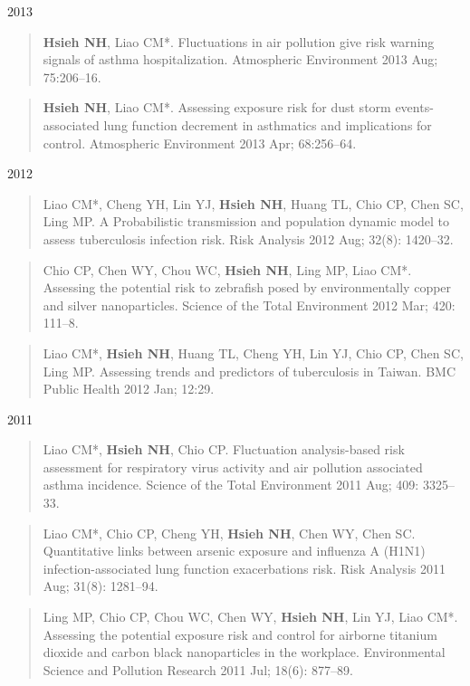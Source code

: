 \documentclass[10pt,]{article}
\begin{document}
2013

\begin{quote}
\textbf{Hsieh NH}, Liao CM*. Fluctuations in air pollution give risk
warning signals of asthma hospitalization. Atmospheric Environment 2013
Aug; 75:206--16.
\end{quote}

\begin{quote}
\textbf{Hsieh NH}, Liao CM*. Assessing exposure risk for dust storm
events-associated lung function decrement in asthmatics and implications
for control. Atmospheric Environment 2013 Apr; 68:256--64.
\end{quote}

2012

\begin{quote}
Liao CM*, Cheng YH, Lin YJ, \textbf{Hsieh NH}, Huang TL, Chio CP, Chen
SC, Ling MP. A Probabilistic transmission and population dynamic model
to assess tuberculosis infection risk. Risk Analysis 2012 Aug; 32(8):
1420--32.
\end{quote}

\begin{quote}
Chio CP, Chen WY, Chou WC, \textbf{Hsieh NH}, Ling MP, Liao CM*.
Assessing the potential risk to zebrafish posed by environmentally
copper and silver nanoparticles. Science of the Total Environment 2012
Mar; 420: 111--8.
\end{quote}

\begin{quote}
Liao CM*, \textbf{Hsieh NH}, Huang TL, Cheng YH, Lin YJ, Chio CP, Chen
SC, Ling MP. Assessing trends and predictors of tuberculosis in Taiwan.
BMC Public Health 2012 Jan; 12:29.
\end{quote}

2011

\begin{quote}
Liao CM*, \textbf{Hsieh NH}, Chio CP. Fluctuation analysis-based risk
assessment for respiratory virus activity and air pollution associated
asthma incidence. Science of the Total Environment 2011 Aug; 409:
3325--33.
\end{quote}

\begin{quote}
Liao CM*, Chio CP, Cheng YH, \textbf{Hsieh NH}, Chen WY, Chen SC.
Quantitative links between arsenic exposure and influenza A (H1N1)
infection-associated lung function exacerbations risk. Risk Analysis
2011 Aug; 31(8): 1281--94.
\end{quote}

\begin{quote}
Ling MP, Chio CP, Chou WC, Chen WY, \textbf{Hsieh NH}, Lin YJ, Liao CM*.
Assessing the potential exposure risk and control for airborne titanium
dioxide and carbon black nanoparticles in the workplace. Environmental
Science and Pollution Research 2011 Jul; 18(6): 877--89.
\end{quote}
\end{document}
